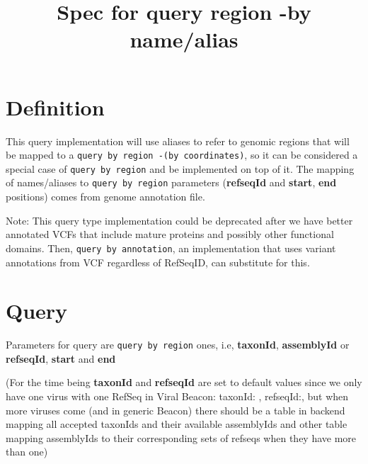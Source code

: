 \documentclass[a4paper, 10pt]{article}        %
\title{Spec for query region -by name/alias}     %
\begin{document}
\date{}
\maketitle

\section{Definition}


This query implementation will use aliases to refer to genomic regions that will be mapped to a \texttt{query by region -(by coordinates)}, so it can be considered a special case of \texttt{query by region} and be implemented on top of it. The mapping of names/aliases to \texttt{query by region} parameters (\textbf{refseqId} and \textbf{start}, \textbf{end} positions) comes from genome annotation file. 


Note: This query type implementation could be deprecated after we have better annotated VCFs that include mature proteins and possibly other functional domains. Then, \texttt{query by annotation}, an implementation that uses variant annotations from VCF regardless of RefSeqID, can substitute for this.


 
\section{Query}
Parameters for query are \texttt{query by region} ones, i.e, \textbf{taxonId}, \textbf{assemblyId} or \textbf{refseqId}, \textbf{start} and \textbf{end}

(For the time being \textbf{taxonId} and \textbf{refseqId} are set to default values since we only have one virus with one RefSeq in Viral Beacon: taxonId: , refseqId:, but when more viruses come (and in generic Beacon) there should be a table in backend mapping all accepted taxonIds and their available assemblyIds and other table mapping assemblyIds to their corresponding sets of refseqs when they have more than one)
\end{document}
